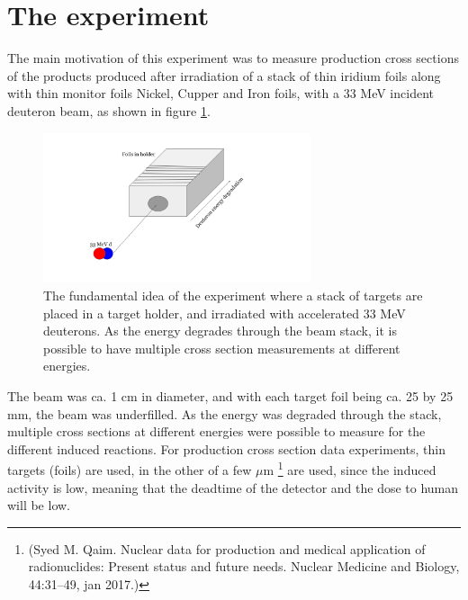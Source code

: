 \section{The experiment}
The main motivation of this experiment was to measure production cross sections of the products produced after irradiation of a stack of thin iridium foils along with thin monitor foils Nickel, Cupper and Iron foils, with a 33 MeV incident deuteron beam, as shown in figure \ref{fig:experiment_illustration}. 
\begin{figure}
    \centering
    \includegraphics[width=0.7\textwidth]{Experiment/Illustration_beamOnTarget.png}
    \caption{The fundamental idea of the experiment where a stack of targets are placed in a target holder, and irradiated with accelerated 33 MeV deuterons. As the energy degrades through the beam stack, it is possible to have multiple cross section measurements at different energies.}
    \label{fig:experiment_illustration}
\end{figure}

The beam was ca. 1 cm in diameter, and with each target foil being ca. 25 by 25 mm, the beam was underfilled. As the energy was degraded through the stack, multiple cross sections at different energies were possible to measure for the different induced reactions. For production cross section data experiments, thin targets (foils) are used, in the other of a few $\mu$m \footnote{(Syed M. Qaim. Nuclear data for production and medical application of radionuclides:
Present status and future needs. Nuclear Medicine and Biology, 44:31–49, jan 2017.)} are used, since the induced activity is low, meaning that the deadtime of the detector and the dose to human will be low.  

\noindent 


